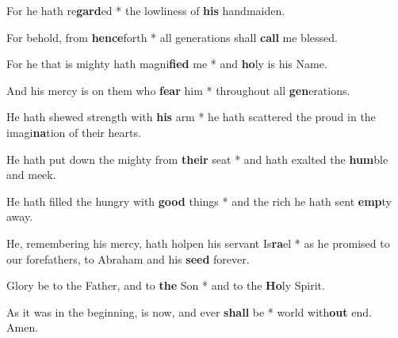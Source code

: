 \begin{multicols}{2}
	For he hath re\textbf{gard}ed * the lowliness of \textbf{his} handmaiden.
	
	For behold, from \textbf{hence}forth * all  generations shall \textbf{call} me blessed.
	
	For he that is mighty hath magni\textbf{fied} me * and \textbf{ho}ly is his Name.
	
	And his mercy is on them who \textbf{fear} him * throughout all \textbf{gen}erations.
	
	He hath shewed strength with \textbf{his} arm * he hath scattered the proud in the imagi\textbf{na}tion of their hearts.
	
	He hath put down the mighty from \textbf{their} seat * and hath exalted the \textbf{hum}ble and meek.
	
	He hath filled the hungry with \textbf{good} things * and the rich he hath sent \textbf{emp}ty away.
	
	He, remembering his mercy, hath holpen his servant Is\textbf{ra}el * as he promised to our forefathers, to Abraham and his \textbf{seed} forever.
	
	Glory be to the Father, and to \textbf{the} Son * and to the \textbf{Ho}ly Spirit.
	
	As it was in the beginning, is now, and ever \textbf{shall} be * world with\textbf{out} end. Amen.
\end{multicols}